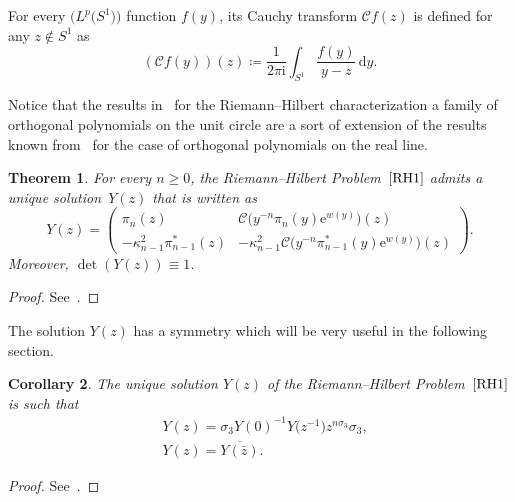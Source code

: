 \documentclass[pdftex]{sigma}%
\numberwithin{equation}{section}
\newtheorem{Theorem}{Theorem}[section]
\newtheorem{Corollary}[Theorem]{Corollary}
\def\e{\mathrm{e}}
\def\d{\mathrm{d}}
\def\i{\mathrm{i}}
\begin{document}
	For every $\big(L^p\big(S^1\big)\big)$ function $f(y)$, its Cauchy transform $\mathcal{C}f(z)$ is defined for any $z \notin S^1$ as
	\begin{equation*}
		\left(\mathcal{C}f(y)\right)(z) \coloneqq\frac{1}{2\pi \i} \int_{S^1} \frac{f(y)}{y-z}\,\d y.
	\end{equation*}
\begin{Remark}
Notice that the results in~\cite{baik1999distribution} for the Riemann--Hilbert characterization a family of orthogonal polynomials on the unit circle are a sort of extension of the results known from~\cite{FokasItsKitaev2, FokasItsKitaev1} for the case of orthogonal polynomials on the real line.
\end{Remark}
	\begin{Theorem}
		For every $n\geq 0$, the Riemann--Hilbert Problem~$\ref{RH1}$ admits a unique solution~$Y(z)$ that is written as
\begin{equation}\label{eq:sol RH}
Y(z)= \begin{pmatrix}
\pi_n(z)&\mathcal{C}\big(y^{-n}\pi_n(y)\e^{w(y)}\big)(z)
\\[1mm]	
-\kappa^2_{n-1}\pi_{n-1}^*(z)&-\kappa_{n-1}^2\mathcal{C}\big(y^{-n}\pi_{n-1}^*(y)\e^{w(y)}\big)(z)			\end{pmatrix}\!.
		\end{equation}
		Moreover, $\det(Y(z))\equiv 1$.
	\end{Theorem}
	\begin{proof}
		See~\cite[Lemma 4.1]{baik1999distribution}.
	\end{proof}

	The solution $Y(z)$ has a symmetry which will be very useful in the following section.
	\begin{Corollary}
		The unique solution $Y(z)$ of the Riemann--Hilbert Problem~$\ref{RH1}$ is such that
		\begin{align}
			\label{eq:sym Y}
			&Y(z) = \sigma_3Y(0)^{-1}Y\big(z^{-1}\big)z^{n\sigma_3}\sigma_3,\\ \label{eq:sym Yconj}
			& Y(z)=\overline{Y(\bar{z})}.
		\end{align}
	\end{Corollary}
	\begin{proof}
	See~\cite[Proposition 5.12]{BaikDeiftSuidan}.
	\end{proof}
\end{document}
